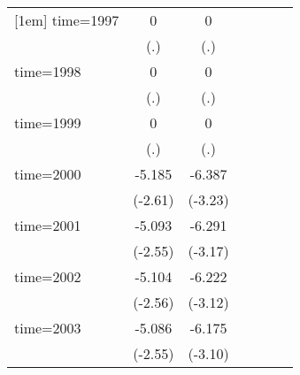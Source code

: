 \begin{table}[htbp]
\begin{tabular}{l*{6}{c}}
[1em]
time=1997           &           0         &           0         &                     &                     &                     &                     \\
                    &         (.)         &         (.)         &                     &                     &                     &                     \\
[1em]
time=1998           &           0         &           0         &                     &                     &                     &                     \\
                    &         (.)         &         (.)         &                     &                     &                     &                     \\
[1em]
time=1999           &           0         &           0         &                     &                     &                     &                     \\
                    &         (.)         &         (.)         &                     &                     &                     &                     \\
[1em]
time=2000           &      -5.185\sym{**} &      -6.387\sym{***}&                     &                     &                     &                     \\
                    &     (-2.61)         &     (-3.23)         &                     &                     &                     &                     \\
[1em]
time=2001           &      -5.093\sym{**} &      -6.291\sym{***}&                     &                     &                     &                     \\
                    &     (-2.55)         &     (-3.17)         &                     &                     &                     &                     \\
[1em]
time=2002           &      -5.104\sym{**} &      -6.222\sym{***}&                     &                     &                     &                     \\
                    &     (-2.56)         &     (-3.12)         &                     &                     &                     &                     \\
[1em]
time=2003           &      -5.086\sym{**} &      -6.175\sym{***}&                     &                     &                     &                     \\
                    &     (-2.55)         &     (-3.10)         &                     &                     &                     &                     \\

\end{tabular}
\end{table}
